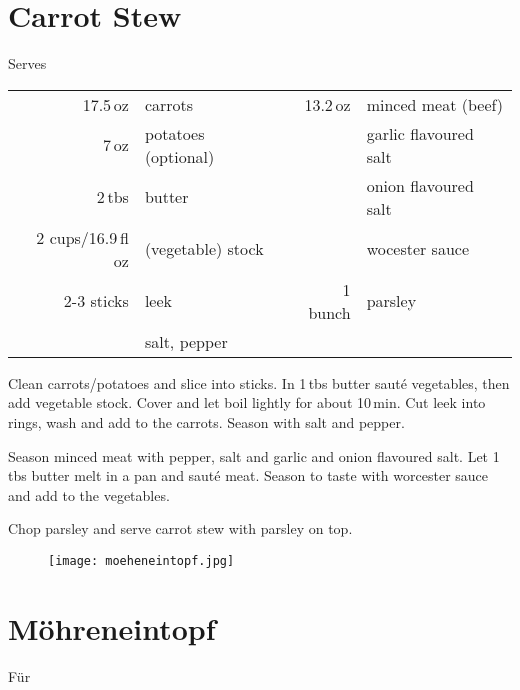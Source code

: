 \section{Carrot Stew}
\begin{centering}

Serves

\end{centering}

\begin{table}[H]
  \centering
    
  \begin{tabular*}{1\textwidth}{rlrl}
    17.5\,oz & carrots  & 13.2\,oz & minced meat (beef) \\
	7\,oz & potatoes (optional) & & garlic flavoured salt \\
	2\,tbs & butter & & onion flavoured salt\\
	2 cups/16.9\,fl oz & (vegetable) stock & & wocester sauce \\
	2-3 sticks & leek & 1 bunch & parsley \\
	& salt, pepper &  & \\
  \end{tabular*}
\end{table}

\begin{Notes}
\item Clean carrots/potatoes and slice into sticks. In 1\,tbs butter saut\'{e} vegetables, then add vegetable stock. Cover and let boil lightly for about 10\,min. Cut leek into rings, wash and add to the carrots. Season with salt and pepper.
\item Season minced meat with pepper, salt and garlic and onion flavoured salt. Let 1\,tbs butter melt in a pan and saut\'{e} meat. Season to taste with worcester sauce and add to the vegetables.
\item Chop parsley and serve carrot stew with parsley on top.
\end{Notes}
\vfill
\begin{figure}[H]
  \centering
  \texttt{[image: moeheneintopf.jpg]}
\end{figure}
\newpage

\section*{M\"{o}hreneintopf}

\begin{centering}

F\"{u}r

\end{centering}

